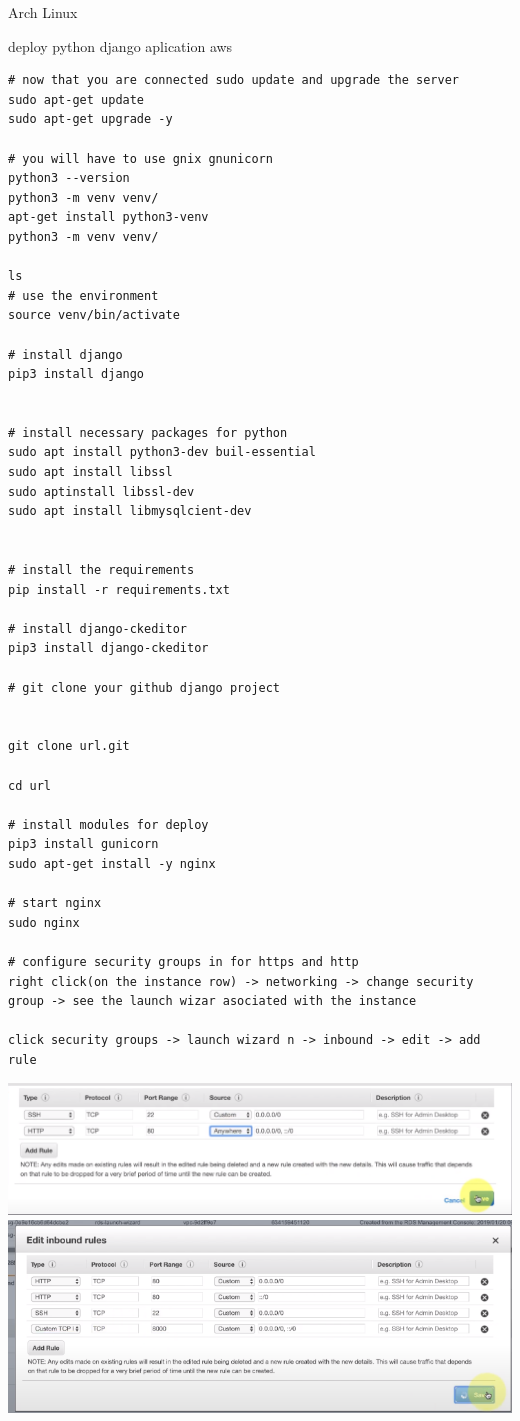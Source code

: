 \begin{section}{Arch Linux}
\begin{subsection}{deploy python django aplication aws}
\begin{verbatim}
# now that you are connected sudo update and upgrade the server
sudo apt-get update
sudo apt-get upgrade -y

# you will have to use gnix gnunicorn
python3 --version
python3 -m venv venv/
apt-get install python3-venv
python3 -m venv venv/

ls
# use the environment
source venv/bin/activate

# install django 
pip3 install django


# install necessary packages for python
sudo apt install python3-dev buil-essential 
sudo apt install libssl
sudo aptinstall libssl-dev
sudo apt install libmysqlcient-dev


# install the requirements
pip install -r requirements.txt

# install django-ckeditor
pip3 install django-ckeditor

# git clone your github django project


git clone url.git

cd url

# install modules for deploy
pip3 install gunicorn
sudo apt-get install -y nginx

# start nginx
sudo nginx

# configure security groups in for https and http
right click(on the instance row) -> networking -> change security group -> see the launch wizar asociated with the instance

click security groups -> launch wizard n -> inbound -> edit -> add rule 

\end{verbatim}

\includegraphics{img_ArchLinux/inboundRules.png}
\includegraphics{img_ArchLinux/inboudUpdate.png}


\end{subsection}
\end{section}
